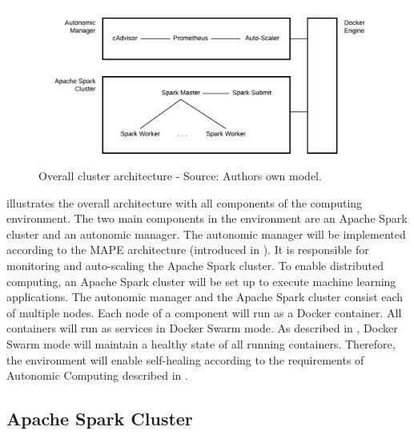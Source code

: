 \begin{figure}[h]
\centering
\includegraphics[scale=0.8]{images/05_conceptual_design/cluster_architecture/overall_architecture}
\caption{Overall cluster architecture - Source: Authors own model.}
\label{fig:ca-overall_architecture}
\end{figure}

 illustrates the overall architecture with all components of the computing environment. The two main components in the environment are an Apache Spark cluster and an autonomic manager.
The autonomic manager will be implemented according to the MAPE architecture (introduced in ). It is responsible for monitoring and auto-scaling the Apache Spark cluster. To enable distributed computing, an Apache Spark cluster will be set up to execute machine learning applications. 
The autonomic manager and the Apache Spark cluster consist each of multiple nodes. Each node of a component will run as a Docker container.
All containers will run as services in Docker Swarm mode. As described in , Docker Swarm mode will maintain a healthy state of all running containers. Therefore, the environment will enable self-healing according to the requirements of Autonomic Computing described in .


\subsection{Apache Spark Cluster}
\label{subsec:05_arch_spark}


